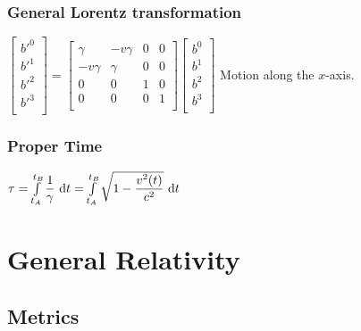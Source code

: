 \subsubsection{General Lorentz transformation}
\begin{itemize}
\itemt 
\( \begin{bmatrix}
b'^0 \\
b'^1 \\
b'^2 \\
b'^3 \\
\end{bmatrix} =
\begin{bmatrix}
\gamma 		&-v\gamma	&0	&0 	\\
-v\gamma 	&\gamma		&0	&0	\\
0 			&0			&1	&0	\\
0 			&0			&0	&1	\\
\end{bmatrix}
\begin{bmatrix}
b^0 \\
b^1 \\
b^2 \\
b^3 \\
\end{bmatrix} \)
\itemt Motion along the $x$-axis.
\end{itemize}


\subsubsection{Proper Time}
\begin{itemize}
\itemt \( \tau = \int\limits_{t_A}^{t_B} \dfrac{1}{\gamma} \ \mathrm{d}t =\int\limits_{t_A}^{t_B} \sqrt{1 - \dfrac{{v}^2(t)}{c^2}} \ \mathrm{d}t \)
\end{itemize}

	\section{General Relativity}
    
		\subsection{Metrics}

